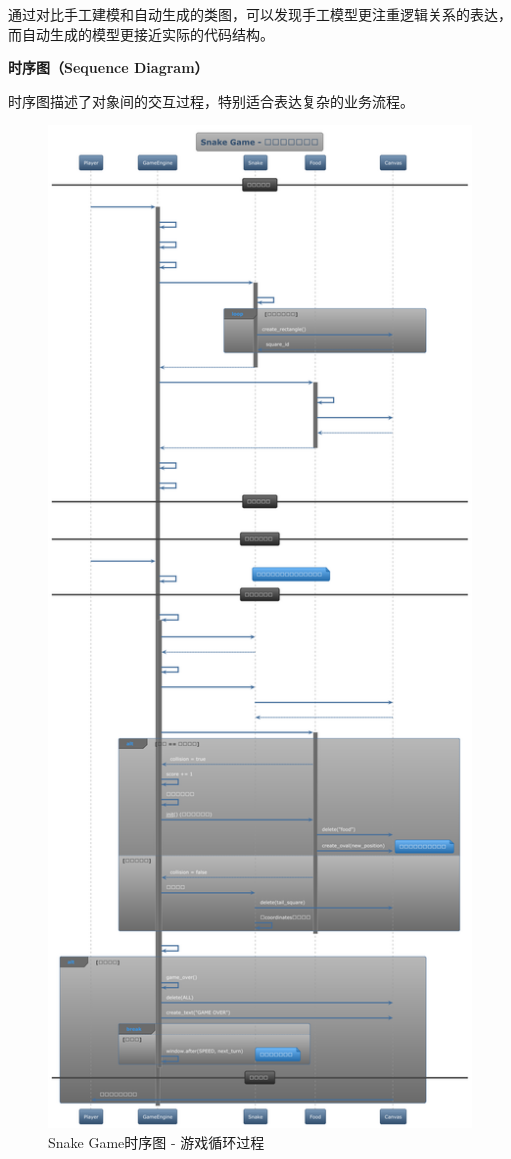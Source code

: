 \documentclass[a4paper]{article}
\begin{document}
通过对比手工建模和自动生成的类图，可以发现手工模型更注重逻辑关系的表达，而自动生成的模型更接近实际的代码结构。

\textbf{时序图（Sequence Diagram）}

时序图描述了对象间的交互过程，特别适合表达复杂的业务流程。

\begin{figure}[H]
\centering
\includegraphics[width=\textwidth]{img/Snake_Game_Sequence.png}
\caption{Snake Game时序图 - 游戏循环过程}
\label{fig:snake_sequence}
\end{figure}
\end{document}
